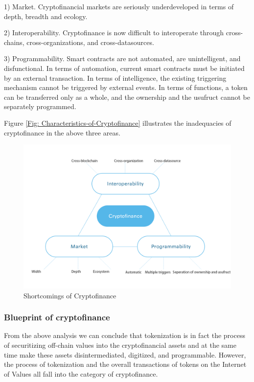 \documentclass[a4paper,12pt]{article}
\begin{document}
1) Market. Cryptofinancial markets are seriously underdeveloped in terms of depth, breadth and ecology.

2) Interoperability. Cryptofinance is now difficult to interoperate through cross-chains, cross-organizations, and cross-datasources.

3) Programmability. Smart contracts are not automated, are unintelligent, and disfunctional. In terms of automation, current smart contracts must be initiated by an external transaction. In terms of intelligence, the existing triggering mechanism cannot be triggered by external events. In terms of functions, a token can be transferred only as a whole, and the ownership and the usufruct cannot be separately programmed.

Figure \ref {Fig: Characteristics-of-Cryptofinance} illustrates the inadequacies of cryptofinance in the above three areas.

\begin {figure} [htbp]
\centering \includegraphics [width = 5in] {pic/Characteristics-of-Cryptofinance.png}
\caption {Shortcomings of Cryptofinance} \label {fig: Characteristics-of-Cryptofinance}
\end {figure}





\subsubsection{Blueprint of cryptofinance}

From the above analysis we can conclude that tokenization is in fact the process of securitizing off-chain values into the cryptofinancial assets and at the same time make these assets disintermediated, digitized, and programmable. However, the process of tokenization and the overall transactions of tokens on the Internet of Values all fall into the category of cryptofinance. 
\end{document}
